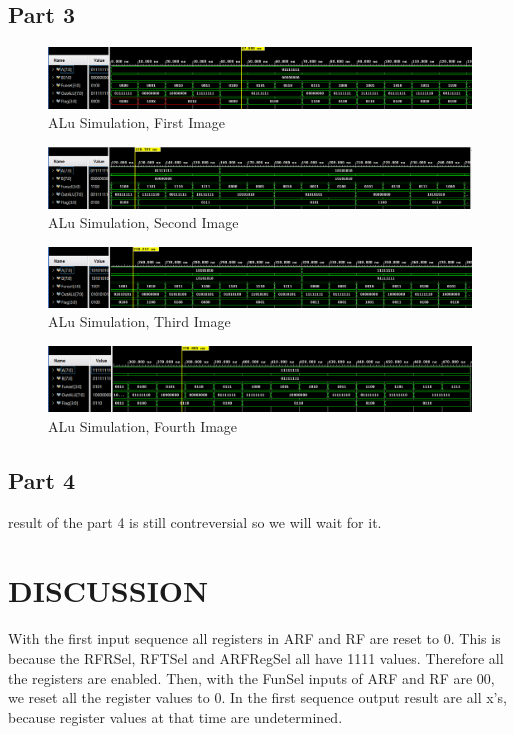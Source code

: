 \documentclass[pdftex,12pt,a4paper]{article}
\begin{document}
\subsection{Part 3}
\begin{figure}[H]
	\centering
	\includegraphics[width=1\textwidth]{results/alu_1.png}	
	\caption{ALu Simulation, First Image}
	\label{ALU Simulation 1}
\end{figure}
\begin{figure}[H]
	\centering
	\includegraphics[width=1\textwidth]{results/alu_2.png}	
	\caption{ALu Simulation, Second Image}
	\label{ALU Simulation 2}
\end{figure}
\begin{figure}[H]
	\centering
	\includegraphics[width=1\textwidth]{results/alu_3.png}	
	\caption{ALu Simulation, Third Image}
	\label{ALU Simulation 3}
\end{figure}
\begin{figure}[H]
	\centering
	\includegraphics[width=1\textwidth]{results/alu_4.png}	
	\caption{ALu Simulation, Fourth Image}
	\label{ALU Simulation 4}
\end{figure}

\subsection{Part 4}
result of the part 4 is still contreversial so we will wait for it.

\section{DISCUSSION}
With the first input sequence all registers in ARF and RF are reset to 0. This is because the RFRSel, RFTSel and ARFRegSel all have 
1111 values. Therefore all the registers are enabled. Then, with the FunSel inputs of ARF and RF are 00, we reset all the register
values to 0. In the first sequence output result are all x's, because register values at that time are undetermined.
\end{document}
